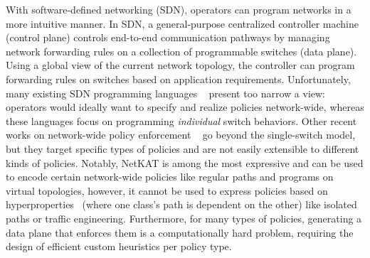 

With software-defined networking (SDN),
operators can program networks in a more intuitive manner. In SDN, a
general-purpose centralized controller machine (control plane)
controls end-to-end communication pathways by managing network
forwarding rules on a collection of programmable switches (data
plane). Using a global view of the current network topology, the
controller can program forwarding rules on switches based on
application requirements.
Unfortunately, many existing SDN programming languages 
~\cite{frenetic,pyretic} present too
narrow a view: operators would ideally want to specify and realize
policies network-wide, whereas these languages focus on
programming {\em individual} switch behaviors. 
 Other recent works on
 network-wide policy enforcement
 ~\cite{merlin,simple,fattire, netkat, netkatcompiler} 
 go beyond the
 single-switch model, but they target specific types of policies 
 and are not easily extensible to different kinds of policies. 
 Notably,
NetKAT is among the most expressive and
can be used to encode certain network-wide policies like regular paths and 
programs on virtual topologies, however, it cannot be used to 
express policies based on hyperproperties~\cite{hyperproperties} 
(where one class's path is dependent on the other) like isolated paths or traffic engineering. 
Furthermore, for many
types of policies, generating a data plane that enforces them is a
computationally hard problem, requiring the design of efficient custom
heuristics per policy type.







